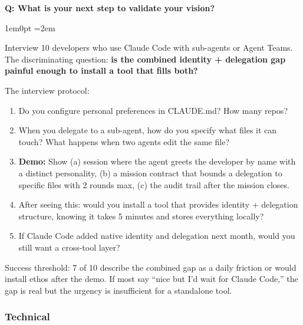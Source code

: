 \documentclass[11pt,letterpaper]{article}
\newcounter{faqnum}
\newenvironment{faqpair}[1]{%
  \needspace{4\baselineskip}%
  \vspace{0.5em}%
  \refstepcounter{faqnum}%
  \noindent\textbf{\color{SectionBlue}Q\thefaqnum: #1}\par\nopagebreak[4]%
  \vspace{0.2em}%
  \begin{adjustwidth}{1em}{0pt}%
  \setlength{\parindent}{0pt}%
  \emergencystretch=2em%
}{%
  \end{adjustwidth}%
  \vspace{0.5em}%
}
\begin{document}
\begin{faqpair}{What is your next step to validate your vision?}
Interview 10 developers who use Claude Code with sub-agents or Agent Teams. The discriminating question: \textbf{is the combined identity + delegation gap painful enough to install a tool that fills both?}

The interview protocol:
\begin{enumerate}[nosep]
  \item Do you configure personal preferences in CLAUDE.md? How many repos?
  \item When you delegate to a sub-agent, how do you specify what files it can touch? What happens when two agents edit the same file?
  \item \textbf{Demo:} Show (a) session where the agent greets the developer by name with a distinct personality, (b) a mission contract that bounds a delegation to specific files with 2 rounds max, (c) the audit trail after the mission closes.
  \item After seeing this: would you install a tool that provides identity + delegation structure, knowing it takes 5 minutes and stores everything locally?
  \item If Claude Code added native identity and delegation next month, would you still want a cross-tool layer?
\end{enumerate}

Success threshold: 7 of 10 describe the combined gap as a daily friction or would install ethos after the demo. If most say ``nice but I'd wait for Claude Code,'' the gap is real but the urgency is insufficient for a standalone tool.
\end{faqpair}

\subsubsection*{Technical}
\end{document}
